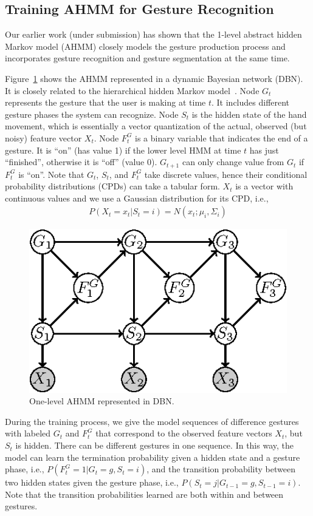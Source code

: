 \documentclass{sigchi}
\begin{document}
\subsection{Training AHMM for Gesture Recognition}
Our earlier work (under submission) has shown that the 1-level abstract hidden
Markov model (AHMM) closely models the gesture production process and
incorporates gesture recognition and gesture segmentation at the same time. 

Figure~\ref{fig:ahmm} shows the AHMM represented in a dynamic Bayesian network
(DBN). It is closely related to the hierarchical hidden Markov
model~\cite{murphy02}. Node $G_t$ represents the gesture that the
user is making at time $t$. It includes different gesture phases the system
can recognize.
Node $S_t$ is the hidden state of the hand movement, which is essentially a
vector quantization of the actual, observed (but noisy) feature vector $X_t$. 
Node $F_t^G$ is a binary variable that indicates the end of a
gesture. It is ``on'' (has value 1) if the lower level HMM at time $t$ has just
``finished'', otherwise it is ``off'' (value 0). $G_{t+1}$ can only change value
from $G_t$ if $F_t^G$ is ``on''. Note that $G_t$, $S_t$, and $F_t^G$ take
discrete values, hence their conditional probability distributions (CPDs)
can take a tabular form. $X_t$ is a vector with continuous values and we use a
Gaussian distribution for its CPD, i.e.,
\begin{align}
P(X_t = x_t | S_t = i) = N(x_t; \mu_i, \Sigma_i)
\end{align}

\begin{figure}
\centering
\includegraphics[]{figure/ahmm.eps}
\caption{One-level AHMM represented in DBN.}
\label{fig:ahmm}
\end{figure}

During the training process, we give the model sequences of difference gestures
with labeled $G_t$ and $F_t^G$ that correspond to the observed feature vectors
$X_t$, but $S_t$ is hidden. There can be different gestures in one sequence. In
this way, the model can learn the termination probability given a hidden state
and a gesture phase, i.e.,
$P(F_t^G = 1 | G_t = g, S_t = i)$, and the transition probability between two
hidden states given the gesture phase, i.e., $P(S_t = j | G_{t - 1} = g,
S_{t - 1} = i)$. Note that the transition probabilities learned are both
within and between gestures.
\end{document}
